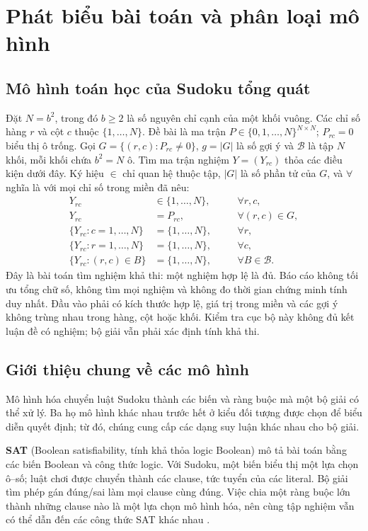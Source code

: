 \documentclass[a4paper]{cas-sc}
\begin{document}
\newpage
\section{Phát biểu bài toán và phân loại mô hình}
\subsection{Mô hình toán học của Sudoku tổng quát}
Đặt $N=b^2$, trong đó $b\ge2$ là số nguyên chỉ cạnh của một khối vuông. Các chỉ số hàng $r$ và cột $c$ thuộc $\{1,\ldots,N\}$. Đề bài là ma trận $P\in\{0,1,\ldots,N\}^{N\times N}$; $P_{rc}=0$ biểu thị ô trống. Gọi $G=\{(r,c):P_{rc}\ne0\}$, $g=|G|$ là số gợi ý và $\mathcal B$ là tập $N$ khối, mỗi khối chứa $b^2=N$ ô. Tìm ma trận nghiệm $Y=(Y_{rc})$ thỏa các điều kiện dưới đây. Ký hiệu $\in$ chỉ quan hệ thuộc tập, $|G|$ là số phần tử của $G$, và $\forall$ nghĩa là với mọi chỉ số trong miền đã nêu:
\begin{equation}\label{eq:sudoku}
\begin{aligned}
Y_{rc}&\in\{1,\ldots,N\}, &&\quad\forall r,c,\\
Y_{rc}&=P_{rc}, &&\quad\forall(r,c)\in G,\\
\bigl\{Y_{rc}:c=1,\ldots,N\bigr\}&=\{1,\ldots,N\}, &&\quad\forall r,\\
\bigl\{Y_{rc}:r=1,\ldots,N\bigr\}&=\{1,\ldots,N\}, &&\quad\forall c,\\
\bigl\{Y_{rc}:(r,c)\in B\bigr\}&=\{1,\ldots,N\}, &&\quad\forall B\in\mathcal B.
\end{aligned}
\end{equation}
Đây là bài toán tìm nghiệm khả thi: một nghiệm hợp lệ là đủ. Báo cáo không tối ưu tổng chữ số, không tìm mọi nghiệm và không đo thời gian chứng minh tính duy nhất. Đầu vào phải có kích thước hợp lệ, giá trị trong miền và các gợi ý không trùng nhau trong hàng, cột hoặc khối. Kiểm tra cục bộ này không đủ kết luận đề có nghiệm; bộ giải vẫn phải xác định tính khả thi.

\subsection{Giới thiệu chung về các mô hình}
Mô hình hóa chuyển luật Sudoku thành các biến và ràng buộc mà một bộ giải có thể xử lý. Ba họ mô hình khác nhau trước hết ở kiểu đối tượng được chọn để biểu diễn quyết định; từ đó, chúng cung cấp các dạng suy luận khác nhau cho bộ giải.

\textbf{SAT} (Boolean satisfiability, tính khả thỏa logic Boolean) mô tả bài toán bằng các biến Boolean và công thức logic. Với Sudoku, một biến biểu thị một lựa chọn ô--số; luật chơi được chuyển thành các clause, tức tuyển của các literal. Bộ giải tìm phép gán đúng/sai làm mọi clause cùng đúng. Việc chia một ràng buộc lớn thành những clause nào là một lựa chọn mô hình hóa, nên cùng tập nghiệm vẫn có thể dẫn đến các công thức SAT khác nhau \citep{lynce2006}.
\end{document}
